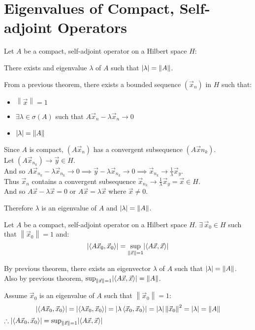 \documentclass[letterpaper,12pt,fleqn]{article}
\renewcommand{\l}{\lambda}
\renewcommand{\o}{\sigma}
\newcommand{\norm}[1]{\left\|#1\right\|}
\newcommand{\inner}[1]{\left<#1\right>}
\newcommand{\vx}{\vec{x}}
\newcommand{\vy}{\vec{y}}
\begin{document}
\section*{Eigenvalues of Compact, Self-adjoint Operators}

\begin{theorem}
  Let $A$ be a compact, self-adjoint operator on a Hilbert space $H$:

  \qquad There exists and eigenvalue $\l$ of $A$ such that
  $\abs{\l}=\norm{A}$.
\end{theorem}

\begin{theproof}
  From a previous theorem, there exists a bounded sequence $(\vx_n)$ in $H$
  such that:
  \begin{itemize}
  \item $\norm{\vx}=1$
  \item $\exists\l\in\o(A)$ such that $A\vx_n-\l\vx_n\to0$
  \item $\abs{\l}=\norm{A}$
  \end{itemize}
  Since $A$ is compact, $(A\vx_n)$ has a convergent subsequence
  $(A\vx{n_k})$. \\
  Let $(A\vx_{n_k})\to\vy\in H$. \\
  And so $A\vx_{n_k}-\l\vx_{n_k}\to0\implies\vy-\l\vx_{n_k}\to0\implies
  \vx_{n_k}\to\frac{1}{\l}\vx_y$. \\
  Thus $\vx_n$ contains a convergent subsequence
  $\vx_{n_k}\to\frac{1}{\l}\vx_y=\vx\in H$. \\
  And so $A\vx-\l\vx=0$ or $A\vx=\l\vx$ where $\vx\ne0$.

  Therefore $\l$ is an eigenvalue of $A$ and $\abs{\l}=\norm{A}$.
\end{theproof}

\begin{corollary}
  Let $A$ be a compact, self-adjoint operator on a Hilbert space $H$.
  $\exists\,\vx_0\in H$ such that $\norm{\vx_0}=1$ and:
  \[\abs{\inner{A\vx_0,\vx_0}}=\sup_{\norm{\vx}=1}\abs{\inner{A\vx,\vx}}\]
\end{corollary}

\begin{theproof}
  By previous theorem, there exists an eigenvector $\l$ of $A$ such that
  $\abs{\l}=\norm{A}$. \\
  Also by previous theorem,
  $\sup_{\norm{\vx}=1}\abs{\inner{A\vx,\vx}}=\norm{A}$.

  Assume $\vx_0$ is an eigenvalue of $A$ such that $\norm{\vx_0}=1$:
  \[\abs{\inner{A\vx_0,\vx_0}}=\abs{\inner{\l\vx_0,\vx_0}}=
  \abs{\l\inner{\vx_0,\vx_0}}=\abs{\l}\norm{\vx_0}^2=\abs{\l}=\norm{A}\]
  $\therefore
  \abs{\inner{A\vx_0,\vx_0}}=\sup_{\norm{\vx}=1}\abs{\inner{A\vx,\vx}}$
\end{theproof}
\end{document}

